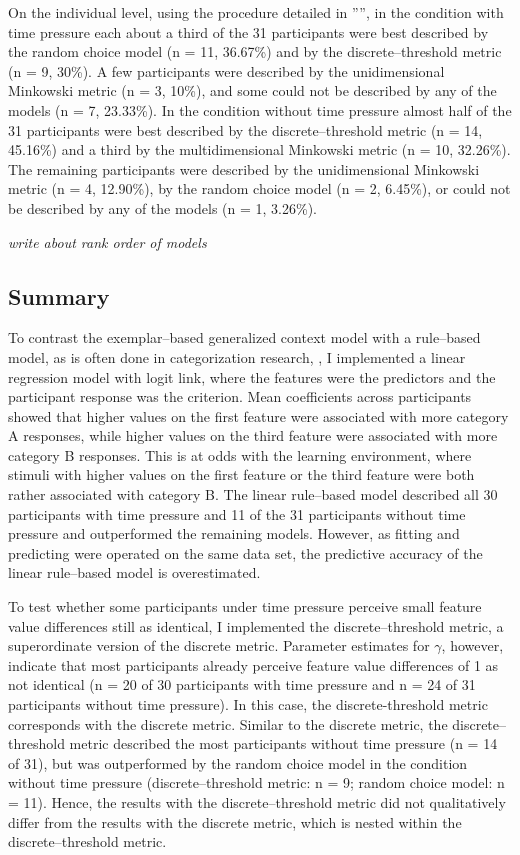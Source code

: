 \documentclass[a4paper,man,natbib]{apa6}
\begin{document}
On the individual level, using the procedure detailed in '''', in the condition with time pressure each about a third of the 31 participants were best described by the random choice model (n = 11, 36.67\%) and by the discrete--threshold metric (n = 9, 30\%). A few participants were described by the unidimensional Minkowski metric (n = 3, 10\%), and some could not be described by any of the models (n = 7, 23.33\%). In the condition without time pressure almost half of the 31 participants were best described by the discrete--threshold metric (n = 14, 45.16\%) and a third by the multidimensional Minkowski metric (n = 10, 32.26\%). The remaining participants were described by the unidimensional Minkowski metric (n = 4, 12.90\%), by the random choice model (n = 2, 6.45\%), or could not be described by any of the models (n = 1, 3.26\%).  

\textit{write about rank order of models}

\subsection{Summary}
To contrast the exemplar--based generalized context model with a rule--based model, as is often done in categorization research, \citep{restle1962selection, tom1968attention, rouder2006comparing}, I implemented a linear regression model with logit link, where the features were the predictors and the participant response was the criterion. Mean coefficients across participants showed that higher values on the first feature were associated with more category A responses, while higher values on the third feature were associated with more category B responses. This is at odds with the learning environment, where stimuli with higher values on the first feature or the third feature were both rather associated with category B. The linear rule--based model described all 30 participants with time pressure and 11 of the 31 participants without time pressure and outperformed the remaining models. However, as fitting and predicting were operated on the same data set, the predictive accuracy of the linear rule--based model is overestimated. 

To test whether some participants under time pressure perceive small feature value differences still as identical, I implemented the discrete--threshold metric, a superordinate version of the discrete metric. Parameter estimates for $\gamma$, however, indicate that most participants already perceive feature value differences of 1 as not identical (n = 20 of 30 participants with time pressure and n = 24 of 31 participants without time pressure). In this case, the discrete-threshold metric corresponds with the discrete metric. Similar to the discrete metric, the discrete--threshold metric described the most participants without time pressure (n = 14 of 31), but was outperformed by the random choice model in the condition without time pressure (discrete--threshold metric: n = 9; random choice model: n = 11). Hence, the results with the discrete--threshold metric did not qualitatively differ from the results with the discrete metric, which is nested within the discrete--threshold metric.
\end{document}
